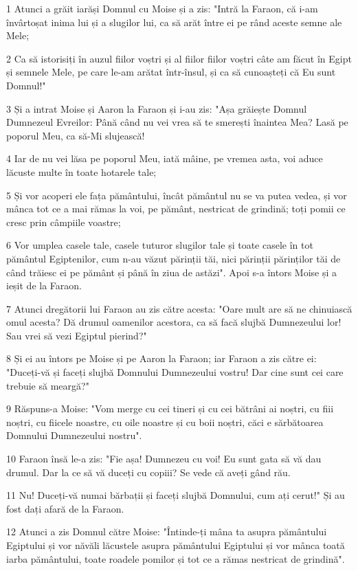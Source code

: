 \par 1 Atunci a grăit iarăși Domnul cu Moise și a zis: "Intră la Faraon, că i-am învârtoșat inima lui și a slugilor lui, ca să arăt între ei pe rând aceste semne ale Mele;
\par 2 Ca să istorisiți în auzul fiilor voștri și al fiilor fiilor voștri câte am făcut în Egipt și semnele Mele, pe care le-am arătat într-însul, și ca să cunoașteți că Eu sunt Domnul!"
\par 3 Și a intrat Moise și Aaron la Faraon și i-au zis: "Așa grăiește Domnul Dumnezeul Evreilor: Până când nu vei vrea să te smerești înaintea Mea? Lasă pe poporul Meu, ca să-Mi slujească!
\par 4 Iar de nu vei lăsa pe poporul Meu, iată mâine, pe vremea asta, voi aduce lăcuste multe în toate hotarele tale;
\par 5 Și vor acoperi ele fața pământului, încât pământul nu se va putea vedea, și vor mânca tot ce a mai rămas la voi, pe pământ, nestricat de grindină; toți pomii ce cresc prin câmpiile voastre;
\par 6 Vor umplea casele tale, casele tuturor slugilor tale și toate casele în tot pământul Egiptenilor, cum n-au văzut părinții tăi, nici părinții părinților tăi de când trăiesc ei pe pământ și până în ziua de astăzi". Apoi s-a întors Moise și a ieșit de la Faraon.
\par 7 Atunci dregătorii lui Faraon au zis către acesta: "Oare mult are să ne chinuiască omul acesta? Dă drumul oamenilor acestora, ca să facă slujbă Dumnezeului lor! Sau vrei să vezi Egiptul pierind?"
\par 8 Și ei au întors pe Moise și pe Aaron la Faraon; iar Faraon a zis către ei: "Duceți-vă și faceți slujbă Domnului Dumnezeului vostru! Dar cine sunt cei care trebuie să meargă?"
\par 9 Răspuns-a Moise: "Vom merge cu cei tineri și cu cei bătrâni ai noștri, cu fiii noștri, cu fiicele noastre, cu oile noastre și cu boii noștri, căci e sărbătoarea Domnului Dumnezeului nostru".
\par 10 Faraon însă le-a zis: "Fie așa! Dumnezeu cu voi! Eu sunt gata să vă dau drumul. Dar la ce să vă duceți cu copiii? Se vede că aveți gând rău.
\par 11 Nu! Duceți-vă numai bărbații și faceți slujbă Domnului, cum ați cerut!" Și au fost dați afară de la Faraon.
\par 12 Atunci a zis Domnul către Moise: "Întinde-ți mâna ta asupra pământului Egiptului și vor năvăli lăcustele asupra pământului Egiptului și vor mânca toată iarba pământului, toate roadele pomilor și tot ce a rămas nestricat de grindină".
